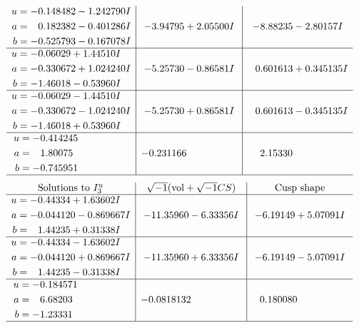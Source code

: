 \documentclass[1p]{elsarticle_modified}
\theoremstyle{definition}
\newcommand{\I}{\sqrt{-1}}
\begin{document}
$$\begin{array}{c|c|c}
\begin{aligned}
u &= -0.148482 - 1.242790 I \\
a &= \phantom{-}0.182382 - 0.401286 I \\
b &= -0.525793 - 0.167078 I\end{aligned}
 & -3.94795 + 2.05500 I & -8.88235 - 2.80157 I \\ \hline\begin{aligned}
u &= -0.06029 + 1.44510 I \\
a &= -0.330672 + 1.024240 I \\
b &= -1.46018 - 0.53960 I\end{aligned}
 & -5.25730 - 0.86581 I & \phantom{-}0.601613 + 0.345135 I \\ \hline\begin{aligned}
u &= -0.06029 - 1.44510 I \\
a &= -0.330672 - 1.024240 I \\
b &= -1.46018 + 0.53960 I\end{aligned}
 & -5.25730 + 0.86581 I & \phantom{-}0.601613 - 0.345135 I \\ \hline\begin{aligned}
u &= -0.414245\phantom{ +0.000000I} \\
a &= \phantom{-}1.80075\phantom{ +0.000000I} \\
b &= -0.745951\phantom{ +0.000000I}\end{aligned}
 & -0.231166\phantom{ +0.000000I} & \phantom{-}2.15330\phantom{ +0.000000I}\\
 \hline 
 \end{array}$$\newpage$$\begin{array}{c|c|c}  
\text{Solutions to }I^u_{3}& \I (\text{vol} + \sqrt{-1}CS) & \text{Cusp shape}\\
 \hline 
\begin{aligned}
u &= -0.44334 + 1.63602 I \\
a &= -0.044120 - 0.869667 I \\
b &= \phantom{-}1.44235 + 0.31338 I\end{aligned}
 & -11.35960 - 6.33356 I & -6.19149 + 5.07091 I \\ \hline\begin{aligned}
u &= -0.44334 - 1.63602 I \\
a &= -0.044120 + 0.869667 I \\
b &= \phantom{-}1.44235 - 0.31338 I\end{aligned}
 & -11.35960 + 6.33356 I & -6.19149 - 5.07091 I \\ \hline\begin{aligned}
u &= -0.184571\phantom{ +0.000000I} \\
a &= \phantom{-}6.68203\phantom{ +0.000000I} \\
b &= -1.23331\phantom{ +0.000000I}\end{aligned}
 & -0.0818132\phantom{ +0.000000I} & \phantom{-}0.180080\phantom{ +0.000000I}\\
 \hline 
 \end{array}$$\newpage\newpage\renewcommand{\arraystretch}{1}
\end{document}
